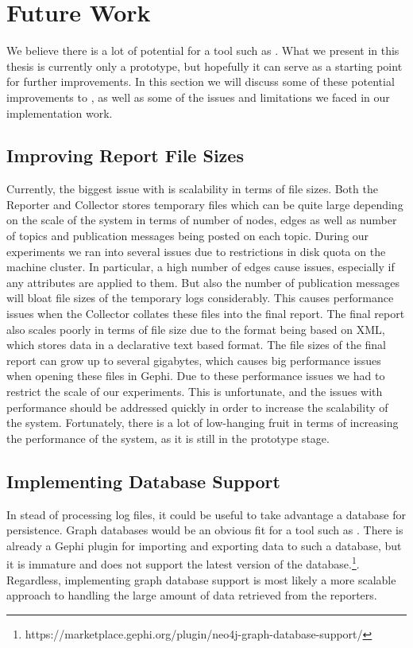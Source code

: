 \section{Future Work}

We believe there is a lot of potential for a tool such as \demo{}. What
we present in this thesis is currently only a prototype, but hopefully
it can serve as a starting point for further improvements. In this
section we will discuss some of these potential improvements to \demo{},
as well as some of the issues and limitations we faced in our implementation work.

\subsection{Improving Report File Sizes}

Currently, the biggest issue with \demo{} is scalability in terms of
file sizes. Both the Reporter and Collector stores temporary files
which can be quite large depending on the scale of the system in terms
of number of nodes, edges as well as number of topics and publication
messages being posted on each topic. During our experiments we ran into
several issues due to restrictions in disk quota on the machine cluster.
In particular, a high number of edges cause issues, especially if any
attributes are applied to them. But also the number of publication
messages will bloat file sizes of the temporary logs considerably. This
causes performance issues when the Collector collates these files into
the final report. The final report also scales poorly in terms of file
size due to the \gexf{} format being based on XML, which stores data in
a declarative text based format. The file sizes of the final report can
grow up to several gigabytes, which causes big performance issues when
opening these files in Gephi. Due to these performance issues we had to
restrict the scale of our experiments. This is unfortunate, and the
issues with performance should be addressed quickly in order to increase
the scalability of the system. Fortunately, there is a lot of
low-hanging fruit in terms of increasing the performance of the system,
as it is still in the prototype stage.

\subsection{Implementing Database Support}

In stead of processing log files, it could be useful to take advantage a
database for persistence. Graph databases would be an obvious fit for a
tool such as \demo{}. There is already a Gephi plugin for importing and
exporting data to such a database, but it is immature and does not
support the latest version of the
database.\footnote{https://marketplace.gephi.org/plugin/neo4j-graph-database-support/}.
Regardless, implementing graph database support is most likely a more
scalable approach to handling the large amount of data retrieved from
the reporters.

